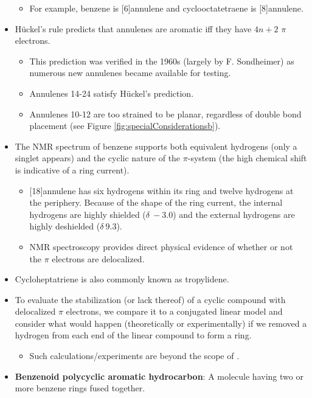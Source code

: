 \documentclass[../notes.tex]{subfiles}
\begin{document}
\begin{itemize}
\begin{itemize}
        \item For example, benzene is [6]annulene and cyclooctatetraene is [8]annulene.
    \end{itemize}
    \item H\"{u}ckel's rule predicts that annulenes are aromatic iff they have $4n+2$ $\pi$ electrons.
    \begin{itemize}
        \item This prediction was verified in the 1960s (largely by F. Sondheimer) as numerous new annulenes became available for testing.
        \item Annulenes 14-24 satisfy H\"{u}ckel's prediction.
        \item Annulenes 10-12 are too strained to be planar, regardless of double bond placement (see Figure \ref{fig:specialConsiderationsb}).
    \end{itemize}
    \item The  NMR spectrum of benzene supports both equivalent hydrogens (only a singlet appears) and the cyclic nature of the $\pi$-system (the high chemical shift is indicative of a ring current).
    \begin{itemize}
        \item {}[18]annulene has six hydrogens within its ring and twelve hydrogens at the periphery. Because of the shape of the ring current, the internal hydrogens are highly shielded ($\delta\ -3.0$) and the external hydrogens are highly deshielded ($\delta\ 9.3$).
        \item NMR spectroscopy provides direct physical evidence of whether or not the $\pi$ electrons are delocalized.
    \end{itemize}
    \item Cycloheptatriene is also commonly known as tropylidene.
    \item To evaluate the stabilization (or lack thereof) of a cyclic compound with delocalized $\pi$ electrons, we compare it to a conjugated linear model and consider what would happen (theoretically or experimentally) if we removed a hydrogen from each end of the linear compound to form a ring.
    \begin{itemize}
        \item Such calculations/experiments are beyond the scope of \textcite{bib:SolomonsEtAl}.
    \end{itemize}
    \item \textbf{Benzenoid polycyclic aromatic hydrocarbon}: A molecule having two or more benzene rings fused together.

\end{itemize}
\end{document}
